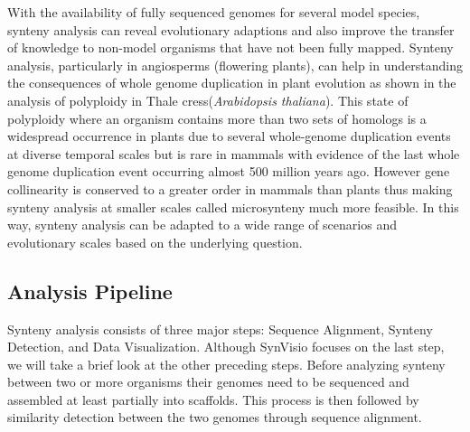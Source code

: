 With the availability of fully sequenced genomes for several model species, synteny analysis can reveal evolutionary adaptions and also improve the transfer of knowledge to non-model organisms that have not been fully mapped\cite{zhao2019network}. Synteny analysis, particularly in angiosperms (flowering plants), can help in understanding the consequences of whole genome duplication in plant evolution\cite{adams2005polyploidy} as shown in the analysis of polyploidy in Thale cress(\textit{Arabidopsis thaliana})\cite{seoighe2003turning}. This state of polyploidy where an organism contains more than two sets of homologs is a widespread occurrence in plants  due to several whole-genome duplication events at diverse temporal scales but is rare in mammals with evidence of the last whole genome duplication event occurring almost 500 million years ago\cite{adams2005polyploidy,panopoulou2005timing}. However gene collinearity is conserved to a greater order in mammals than plants thus making synteny analysis at smaller scales called microsynteny much more feasible\cite{zhao2019network}. In this way, synteny analysis can be adapted to a wide range of scenarios and evolutionary scales based on the underlying question.

\subsection{Analysis Pipeline}

Synteny analysis consists of three major steps: Sequence Alignment, Synteny Detection, and Data Visualization. Although SynVisio focuses on the last step, we will take a brief look at the other preceding steps. Before analyzing synteny between two or more organisms their genomes need to be sequenced and assembled at least partially into scaffolds. This process is then followed by similarity detection between the two genomes through sequence alignment.



